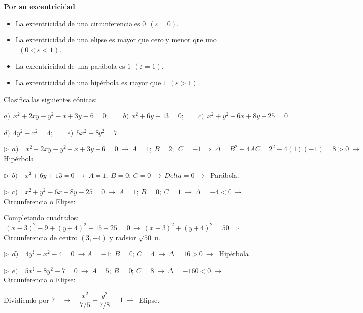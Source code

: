 \vspace{5mm}
\textbf{Por su excentricidad}

\begin{itemize}
\item La excentricidad de una circunferencia es $0\ \  (\varepsilon = 0)$.
\item La excentricidad de una elipse es mayor que cero y menor que uno $\ \ (0 < \varepsilon < 1)$.
\item La excentricidad de una parábola es $1\ \  (\varepsilon = 1)$.
\item La excentricidad de una hipérbola es mayor que $1\ \  (\varepsilon > 1)$.	
\end{itemize}


\vspace{5mm}

\begin{miejemplo}

Clasifica las siguientes cónicas:

\vspace{2mm} $a)\ \ x^2+2xy-y^2-x+3y-6=0;\qquad b)\ \ x^2+6y+13=0;\qquad c)\ \ x^2+y^2-6x+8y-25=0$

\vspace{2mm} $d)\ \ 4y^2-x^2=4;\qquad e)\ \ 5x^2+8y^2=7$

\vspace{15mm} $\triangleright\ \ a) \quad  x^2+2xy-y^2-x+3y-6=0 \ \to \ A=1;\ B=2;\ \ C= -1 \ \Rightarrow  \ \Delta=B^2-4AC=2^2-4(1)(-1)=8>0 \ \to \ $ Hipérbola


\vspace{5mm} $\triangleright\ \ b) \quad x^2+6y+13=0 \ \to \ A=1;\ B=0;\ C=0 \ \to \ Delta=0 \ \to \ $ Parábola.


\vspace{5mm} $\triangleright\ \ c) \quad x^2+y^2-6x+8y-25=0 \ \to \ A=1;\ B=0;\ C=1 \ \to \ \Delta=-4<0 \ \to \ $ Circunferencia o Elipse:

\vspace{2mm} Completando cuadrados: $\ (x-3)^2-9+(y+4)^2-16-25=0 \ \to \ (x-3)^2+(y+4)^2=50 \ \Rightarrow \ $ Circunferencia de centro $(3,-4)$ y radsior $\sqrt{50}\ \mathrm{u}$.

\vspace{5mm} $\triangleright\ \ d) \quad 4y^2-x^2-4=0 \ \to A=-1;\ B=0;\ C=4 \ \to \ \Delta=16>0 \ \to \ $ Hipérbola


\vspace{5mm} $\triangleright\ \ e) \quad 5x^2+8y^2-7=0 \ \to \ A=5;\ B=0;\ C=8 \ \to \ \Delta=-160<0 \ \to \   $ Circunferencia o Elipse:

\vspace{2mm} Dividiendo por $7 \quad \to \quad \dfrac{x^2}{7/5}+\dfrac{y^2}{7/8}=1 \ \to \ $ Elipse.
	
\end{miejemplo}

